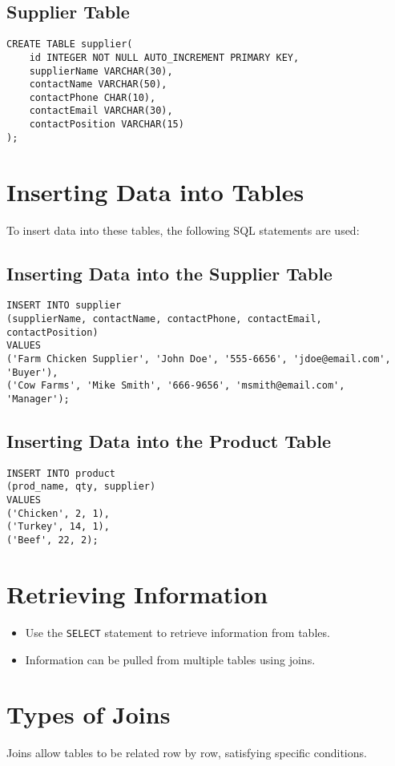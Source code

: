 \documentclass{article}
\begin{document}
\subsection{Supplier Table}
\begin{verbatim}
CREATE TABLE supplier(
    id INTEGER NOT NULL AUTO_INCREMENT PRIMARY KEY,
    supplierName VARCHAR(30),
    contactName VARCHAR(50),
    contactPhone CHAR(10),
    contactEmail VARCHAR(30),
    contactPosition VARCHAR(15)
);
\end{verbatim}

\section{Inserting Data into Tables}
To insert data into these tables, the following SQL statements are used:

\subsection{Inserting Data into the Supplier Table}
\begin{verbatim}
INSERT INTO supplier
(supplierName, contactName, contactPhone, contactEmail, contactPosition)
VALUES
('Farm Chicken Supplier', 'John Doe', '555-6656', 'jdoe@email.com', 'Buyer'),
('Cow Farms', 'Mike Smith', '666-9656', 'msmith@email.com', 'Manager');
\end{verbatim}

\subsection{Inserting Data into the Product Table}
\begin{verbatim}
INSERT INTO product
(prod_name, qty, supplier)
VALUES
('Chicken', 2, 1),
('Turkey', 14, 1),
('Beef', 22, 2);
\end{verbatim}

\section{Retrieving Information}
\begin{itemize}
    \item Use the \texttt{SELECT} statement to retrieve information from tables.
    \item Information can be pulled from multiple tables using joins.
\end{itemize}

\section{Types of Joins}
Joins allow tables to be related row by row, satisfying specific conditions.
\end{document}
